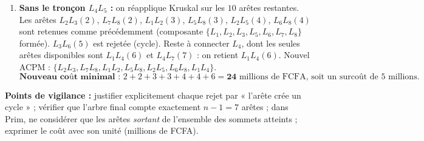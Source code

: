 \documentclass[11pt]{article}
\begin{document}
\begin{corrige}
\begin{enumerate}
\begin{center}
\begin{tabular}{|c|l|l|c|}
\end{tabular}
\end{center}
Arbre obtenu : $\{L_1L_2, L_2L_3, L_2L_5, L_4L_5, L_5L_8, L_7L_8, L_6L_8\}$ — exactement le même qu'avec Kruskal. Coût : $3+2+4+1+3+2+4 = \mathbf{19}$ millions de FCFA. Les deux algorithmes confirment le même coût minimal.
\item \textbf{Sans le tronçon $L_4L_5$ :} on réapplique Kruskal sur les $10$ arêtes restantes. Les arêtes $L_2L_3(2)$, $L_7L_8(2)$, $L_1L_2(3)$, $L_5L_8(3)$, $L_2L_5(4)$, $L_6L_8(4)$ sont retenues comme précédemment (composante $\{L_1, L_2, L_3, L_5, L_6, L_7, L_8\}$ formée). $L_3L_6(5)$ est rejetée (cycle). Reste à connecter $L_4$, dont les seules arêtes disponibles sont $L_1L_4(6)$ et $L_4L_7(7)$ : on retient $L_1L_4(6)$.
Nouvel ACPM : $\{L_2L_3, L_7L_8, L_1L_2, L_5L_8, L_2L_5, L_6L_8, L_1L_4\}$.
\[ \textbf{Nouveau coût minimal : } 2+2+3+3+4+4+6 = \mathbf{24} \text{ millions de FCFA, soit un surcoût de } 5 \text{ millions.} \]
\end{enumerate}
\textbf{Points de vigilance :} justifier explicitement chaque rejet par « l'arête crée un cycle » ; vérifier que l'arbre final compte exactement $n-1 = 7$ arêtes ; dans Prim, ne considérer que les arêtes \emph{sortant} de l'ensemble des sommets atteints ; exprimer le coût avec son unité (millions de FCFA).
\end{corrige}
\end{document}

